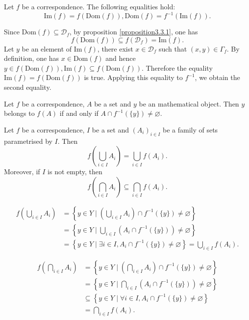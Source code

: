 \begin{propositionenv}\label{proposition3.3.2}
    Let $f$ be a correspondence. The following equalities hold:
    $$\mathrm{Im}(f)=f(\mathrm{Dom}(f)), \mathrm{Dom}(f)=f^{-1}(\mathrm{Im}(f)).$$
\end{propositionenv}
\begin{proofenv}
    Since $\mathrm{Dom}(f)\subseteq\mathscr{D}_f$,  by proposition \ref{proposition3.3.1},  one has 
    $$f(\mathrm{Dom}(f))\subseteq f(\mathscr{D}_f)=\mathrm{Im}(f).$$
    Let $y$ be an element of $\mathrm{Im}(f)$,  there exist $x\in \mathscr{D}_f$ such that $(x, y)\in \Gamma_f$. By definition,  one has $x\in \mathrm{Dom }(f)$ and hence $y\in f(\mathrm{Dom }(f)), \mathrm{Im}(f)\subseteq f(\mathrm{Dom }(f))$. Therefore the equality $\mathrm{Im}(f)=f(\mathrm{Dom}(f))$ is true. Applying this equality to $f^{-1}$,  we obtain the second equality.
\end{proofenv}
\begin{propositionenv}
    Let $f$ be a correspondence,  $A$ be a set and $y$ be an mathematical object. Then $y$ belongs to $f(A)$ if and only if $A\cap f^{-1}(\{y\})\not=\varnothing$.
\end{propositionenv}
\begin{propositionenv}\label{proposition3.3.4}
    Let $f$ be a correspondence,  $I$ be a set and $(A_i)_{i\in I}$ be a family of sets parametrised by $I$. Then
    $$f\left( \bigcup_{i\in I}A_i\right)=\bigcup_{i\in I}f(A_i).$$
    Moreover, if $I$ is not empty,  then 
    $$f\left( \bigcap_{i\in I}A_i\right)\subseteq \bigcap_{i\in I}f(A_i).$$

\end{propositionenv}
\begin{proofenv}
   \begin{align*}
         f\left( \bigcup_{i\in I}A_i\right)&=\left\{ y\in Y\mid \left( \bigcup_{i\in I}A_i\right)\cap f^{-1}(\{y\})\not=\varnothing  \right\}\\
        &=\left\{ y\in Y\mid \bigcup_{i\in I}\left(A_i\cap f^{-1}(\{y\})\right)\not=\varnothing  \right\}\\
        &=\left\{y\in Y\mid \exists i \in I, A_i\cap f^{-1}(\{y\})\not =\varnothing\right\}=\bigcup_{i\in I}f(A_i).
   \end{align*}

    \begin{align*}
        f\left(\bigcap_{i\in I}A_i \right)&=\left\{ y\in Y\mid \left( \bigcap_{i\in I}A_i\right) \cap f^{-1}(\{y\})\not=\varnothing\right\}\\
        &=\left\{ y\in Y\mid  \bigcap_{i\in I}\left(A_i \cap f^{-1}(\{y\})\right)\neq\varnothing\right\}\\
        &\subseteq \left\{  y\in Y\mid \forall i\in I,  A_i\cap f^{-1}(\{y\})\not=\varnothing\right\}\\
        &=\bigcap_{i\in I}f(A_i).
    \end{align*}
\end{proofenv}
